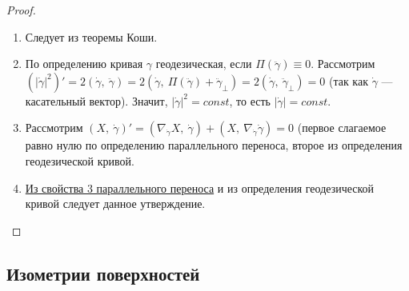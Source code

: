 \documentclass[12pt]{article}
\newcommand\tab[1][.5cm]{\hspace*{#1}}
\theoremstyle{plain}
\begin{document}
    \begin{proof}\tab
        \begin{enumerate}
            \item Следует из теоремы Коши.
            \item По определению кривая $\gamma$ геодезическая, если $\Pi(\ddot{\gamma})\equiv0$. Рассмотрим $(|\dot{\gamma}|^2)'=2(\dot{\gamma}, \ \ddot{\gamma})=2(\dot{\gamma}, \ \Pi(\ddot{\gamma})+\ddot{\gamma}_{\perp})=2(\dot{\gamma}, \ \ddot{\gamma}_{\perp})=0$ (так как $\dot{\gamma}$ --- касательный вектор). Значит, $|\dot{\gamma}|^2=const$, то есть $|\dot{\gamma}|=const$.
            \item Рассмотрим $(X, \ \dot{\gamma})'=(\nabla_{\dot{\gamma}}X, \ \dot{\gamma})+(X, \ \nabla_{\dot{\gamma}}\dot{\gamma})=0$ (первое слагаемое равно нулю по определению параллельного переноса, второе из определения геодезической кривой.
            \item \hyperlink{6}{Из свойства 3 параллельного переноса} и из определения геодезической кривой следует данное утверждение.
        \end{enumerate}
    \end{proof}
    \subsection{Изометрии поверхностей}
\end{document}
